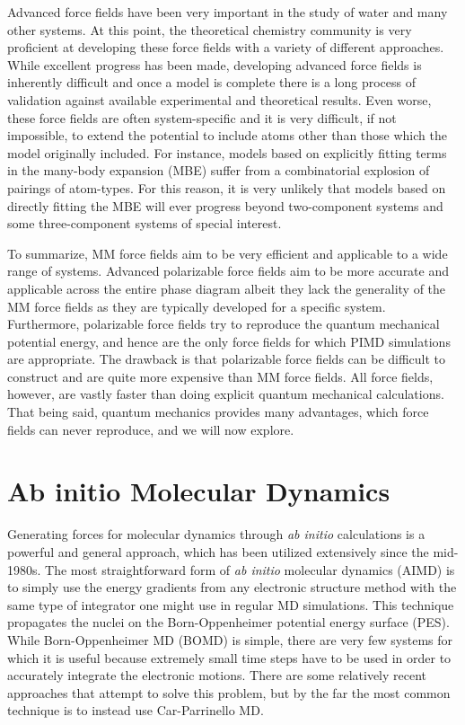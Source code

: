 \documentclass[11pt, proquest]{uwthesis}[2020/02/24]
\begin{document}
\par Advanced force fields have been very important in the study of water and many other systems. At this point, the theoretical chemistry community is very proficient at developing these force fields with a variety of different approaches. While excellent progress has been made, developing advanced force fields is inherently difficult and once a model is complete there is a long process of validation against available experimental and theoretical results. Even worse, these force fields are often system-specific and it is very difficult, if not impossible, to extend the potential to include atoms other than those which the model originally included. For instance, models based on explicitly fitting terms in the many-body expansion (MBE) suffer from a combinatorial explosion of pairings of atom-types. For this reason, it is very unlikely that models based on directly fitting the MBE will ever progress beyond two-component systems and some three-component systems of special interest.

\par To summarize, MM force fields aim to be very efficient and applicable to a wide range of systems. Advanced polarizable force fields aim to be more accurate and applicable across the entire phase diagram albeit they lack the generality of the MM force fields as they are typically developed for a specific system. Furthermore, polarizable force fields try to reproduce the quantum mechanical potential energy, and hence are the only force fields for which PIMD simulations are appropriate. The drawback is that polarizable force fields can be difficult to construct and are quite more expensive than MM force fields. All force fields, however, are vastly faster than doing explicit quantum mechanical calculations. That being said, quantum mechanics provides many advantages, which force fields can never reproduce, and we will now explore.

\section{Ab initio Molecular Dynamics}
\par Generating forces for molecular dynamics through \textit{ab initio} calculations is a powerful and general approach, which has been utilized extensively since the mid-1980s. The most straightforward form of \textit{ab initio} molecular dynamics (AIMD) is to simply use the energy gradients from any electronic structure method with the same type of integrator one might use in regular MD simulations. This technique propagates the nuclei on the Born-Oppenheimer potential energy surface (PES). While Born-Oppenheimer MD (BOMD) is simple, there are very few systems for which it is useful because extremely small time steps have to be used in order to accurately integrate the electronic motions. There are some relatively recent approaches that attempt to solve this problem\autocite{kuhne_efficient_2007}, but by the far the most common technique is to instead use Car-Parrinello MD\autocite{car_unified_1985}.
\end{document}
